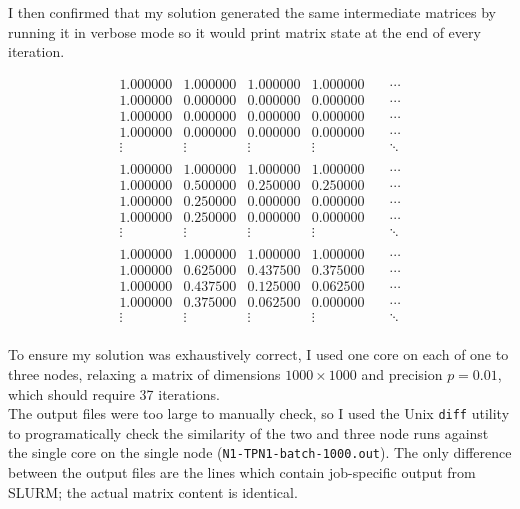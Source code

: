 \documentclass[12pt]{article}
\begin{document}
I then confirmed that my solution generated the same intermediate matrices by running it in verbose mode so it would print matrix state at the end of every iteration.

\begin{minipage}{.45\textwidth}
$$
\begin{matrix}
1.000000 & 1.000000 & 1.000000 & 1.000000 & \quad\cdots \\
1.000000 & 0.000000 & 0.000000 & 0.000000 & \quad\cdots \\
1.000000 & 0.000000 & 0.000000 & 0.000000 & \quad\cdots \\
1.000000 & 0.000000 & 0.000000 & 0.000000 & \quad\cdots \\
\vdots & \vdots & \vdots & \vdots & \quad\ddots \\
\end{matrix}
$$
$$
\begin{matrix}
1.000000 & 1.000000 & 1.000000 & 1.000000 & \quad\cdots \\
1.000000 & 0.500000 & 0.250000 & 0.250000 & \quad\cdots \\
1.000000 & 0.250000 & 0.000000 & 0.000000 & \quad\cdots \\
1.000000 & 0.250000 & 0.000000 & 0.000000 & \quad\cdots \\
\vdots & \vdots & \vdots & \vdots & \quad\ddots \\
\end{matrix}
$$
$$
\begin{matrix}
1.000000 & 1.000000 & 1.000000 & 1.000000 & \quad\cdots \\
1.000000 & 0.625000 & 0.437500 & 0.375000 & \quad\cdots \\
1.000000 & 0.437500 & 0.125000 & 0.062500 & \quad\cdots \\
1.000000 & 0.375000 & 0.062500 & 0.000000 & \quad\cdots \\
\vdots & \vdots & \vdots & \vdots & \quad\ddots \\
\end{matrix}
$$

\end{minipage}\hspace{2cm}
\begin{minipage}{.42\textwidth}
	To ensure my solution was exhaustively correct, I used one core on each of one to three nodes, relaxing a matrix of dimensions $1000 \times{} 1000$ and precision $p=0.01$, which should require 37 iterations.\\
	
	The output files were too large to manually check, so I used the Unix \texttt{diff} utility to programatically check the similarity of the two and three node runs against the single core on the single node (\texttt{N1-TPN1-batch-1000.out}). The only difference between the output files are the lines which contain job-specific output from SLURM; the actual matrix content is identical.
\end{minipage}
\end{document}
